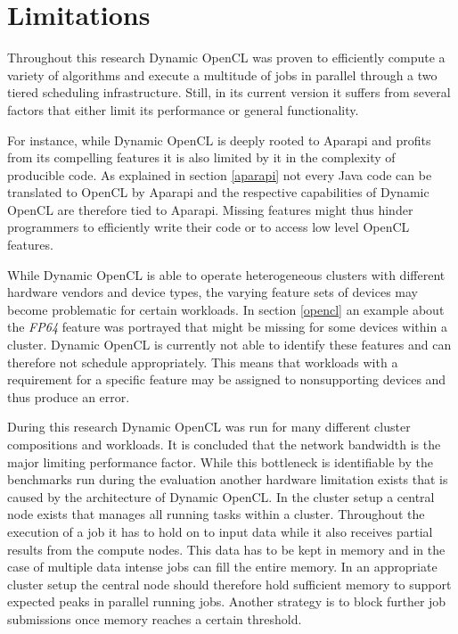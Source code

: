 \chapter{Limitations}

Throughout this research Dynamic OpenCL was proven to efficiently compute a variety of algorithms and  execute a multitude of jobs in parallel through a two tiered scheduling infrastructure. Still, in its current version it suffers from several factors that either limit its performance or general functionality.

For instance, while Dynamic OpenCL is deeply rooted to Aparapi and profits from its compelling features it is also limited by it in the complexity of producible code. As explained in section \ref{aparapi} not every Java code can be translated to OpenCL by Aparapi and the respective capabilities of Dynamic OpenCL are therefore tied to Aparapi. Missing features might thus hinder programmers to efficiently write their code or to access low level OpenCL features.

While Dynamic OpenCL is able to operate heterogeneous clusters with different hardware vendors and device types, the varying feature sets of devices may become problematic for certain workloads. In section \ref{opencl} an example about the \textit{FP64} feature was portrayed that might be missing for some devices within a cluster. Dynamic OpenCL is currently not able to identify these features and can therefore not schedule appropriately. This means that workloads with a requirement for a specific feature may be assigned to nonsupporting devices and thus produce an error.

During this research Dynamic OpenCL was run for many different cluster compositions and workloads. It is concluded that the network bandwidth is the major limiting performance factor. While this bottleneck is identifiable by the benchmarks run during the evaluation another hardware limitation exists that is caused by the architecture of Dynamic OpenCL. In the cluster setup a central node exists that manages all running tasks within a cluster. Throughout the execution of a job it has to hold on to input data while it also receives partial results from the compute nodes. This data has to be kept in memory and in the case of multiple data intense jobs can fill the entire memory. In an appropriate cluster setup the central node should therefore hold sufficient memory to support expected peaks in parallel running jobs. Another strategy is to block further job submissions once memory reaches a certain threshold.

